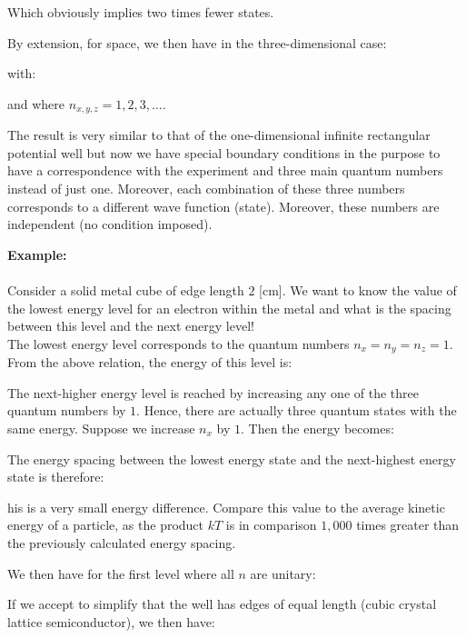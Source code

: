 	Which obviously implies two times fewer states.

	By extension, for space, we then have in the three-dimensional case:
	
	with:
	
	and where $n_{x,y,z}=1,2,3,\ldots$.
	
	The result is very similar to that of the one-dimensional infinite rectangular potential well but now we have special boundary conditions in the purpose to have a correspondence with the experiment and three main quantum numbers instead of just one. Moreover, each combination of these three numbers corresponds to a different wave function (state). Moreover, these numbers are independent (no condition imposed).
	\begin{tcolorbox}[colframe=black,colback=white,sharp corners]
	\textbf{{\Large {}}Example:}\\\\
	Consider a solid metal cube of edge length $2$ [cm]. We want to know the value of the lowest energy level for an electron within the metal and what is the spacing between this level and the next energy level!\\
	
	The lowest energy level corresponds to the quantum numbers $n_x=n_y=n_z=1$. From the above relation, the energy of this level is:
	
	The next-higher energy level is reached by increasing any one of the three quantum numbers by $1$. Hence, there are actually three quantum states with the same energy. Suppose we increase $n_x$ by $1$. Then the energy becomes:
	\end{tcolorbox}
	\begin{tcolorbox}[colframe=black,colback=white,sharp corners]
	
	The energy spacing between the lowest energy state and the next-highest energy state is therefore:
	
	his is a very small energy difference. Compare this value to the average kinetic energy of a particle, as the product $kT$ is in comparison $1,000$ times greater than the previously calculated energy spacing.
	\end{tcolorbox}
	We then have for the first level where all $n$ are unitary:
	
	If we accept to simplify that the well has edges of equal length (cubic crystal lattice semiconductor), we then have:
	
